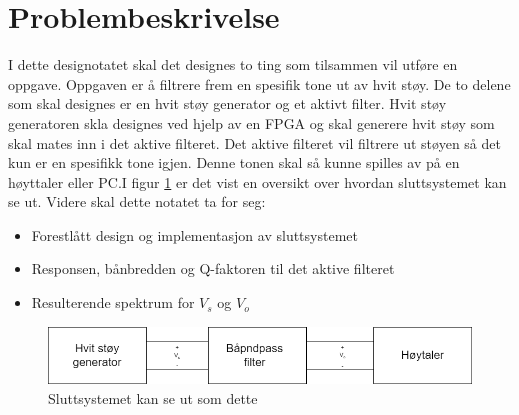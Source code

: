 \clearpage
\section{Problembeskrivelse}
\label{problemBeskrivelse}


I dette designotatet skal det designes to ting som tilsammen vil utføre en oppgave. Oppgaven er å filtrere frem en spesifik tone ut av hvit støy. De to delene som skal designes er en hvit støy generator og et aktivt filter. Hvit støy generatoren skla designes ved hjelp av en FPGA og skal generere hvit støy som skal mates inn i det aktive filteret. Det aktive filteret vil filtrere ut støyen så det kun er en spesifikk tone igjen. Denne tonen skal så kunne spilles av på en høyttaler eller PC.I figur \ref{overview} er det vist en oversikt over hvordan sluttsystemet kan se ut. Videre skal dette notatet ta for seg:
\begin{itemize}
    \item Forestlått design og implementasjon av sluttsystemet
    \item Responsen, bånbredden og Q-faktoren til det aktive filteret
    \item Resulterende spektrum for $V_s$ og $V_o$
\end{itemize}

\begin{figure}[!h]
\centering
\includegraphics[width=1\linewidth]{Bilder/overblikk.drawio.png}
\caption{Sluttsystemet kan se ut som dette}
\label{overview}
\end{figure}